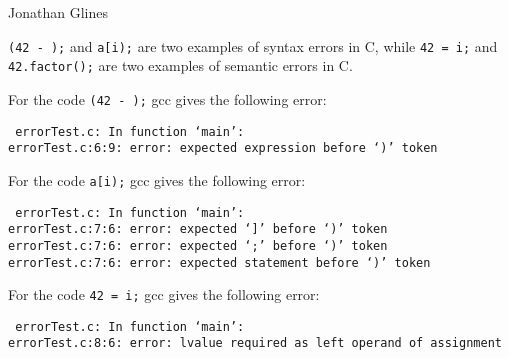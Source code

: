 \documentclass[12pt]{article}
\begin{document}
\begin{flushright}
\Large{Jonathan Glines}
\end{flushright}
{\tt (42 - );} and {\tt a[i);} are two examples of syntax errors in C, while {\tt 42 = i;} and {\tt 42.factor();} are two examples of semantic errors in C.

For the code {\tt (42 - );} gcc gives the following error:

{\tt
errorTest.c: In function ‘main’:\\
errorTest.c:6:9: error: expected expression before ‘)’ token
}

For the code {\tt a[i);} gcc gives the following error:

{\tt
errorTest.c: In function ‘main’:\\
errorTest.c:7:6: error: expected ‘]’ before ‘)’ token\\
errorTest.c:7:6: error: expected ‘;’ before ‘)’ token\\
errorTest.c:7:6: error: expected statement before ‘)’ token
}

For the code {\tt 42 = i;} gcc gives the following error:

{\tt
errorTest.c: In function ‘main’:\\
errorTest.c:8:6: error: lvalue required as left operand of assignment
}

{\tt
}
\end{document}
